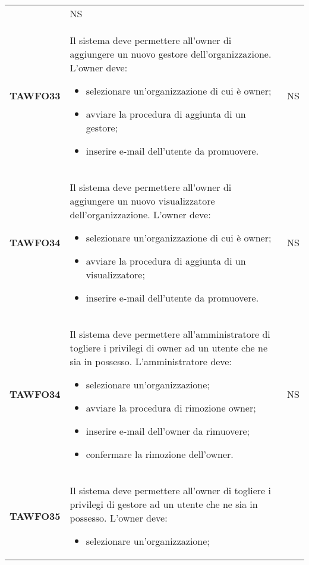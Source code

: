\documentclass[../piano-di-qualifica.tex]{subfiles}
\begin{document}
\begin{centering}
\begin{longtable}[H]{>{\centering\bfseries}m{3cm} >{}p{10cm} >{\centering\arraybackslash}m{3cm}}
\begin{itemize}
        \end{itemize}
        & NS \\
        TAWFO33      & Il sistema deve permettere all’owner di aggiungere un nuovo gestore dell’organizzazione.    \newline
        L'owner deve: 
        \begin{itemize} 
         \item selezionare un'organizzazione di cui è owner;
         \item avviare la procedura di aggiunta di un gestore;
         \item inserire e-mail dell'utente da promuovere.
        \end{itemize}
        & NS \\
        TAWFO34      & Il sistema deve permettere all’owner di aggiungere un nuovo visualizzatore dell’organizzazione.    \newline
        L'owner deve: 
        \begin{itemize} 
         \item selezionare un'organizzazione di cui è owner;
         \item avviare la procedura di aggiunta di un visualizzatore;
         \item inserire e-mail dell'utente da promuovere.
        \end{itemize}
        & NS \\
        TAWFO34      & Il sistema deve permettere all’amministratore di togliere i privilegi di owner ad un utente che ne sia in possesso.    \newline
        L'amministratore deve: 
        \begin{itemize} 
         \item selezionare un'organizzazione;
         \item avviare la procedura di rimozione owner;
         \item inserire e-mail dell'owner da rimuovere;
         \item confermare la rimozione dell'owner.
        \end{itemize}
        & NS \\
        TAWFO35      & Il sistema deve permettere all’owner di togliere i privilegi di gestore ad un utente che ne sia in possesso. \newline
        L'owner deve: 
        \begin{itemize} 
         \item selezionare un'organizzazione;

\end{itemize}
\end{longtable}
\end{centering}
\end{document}
